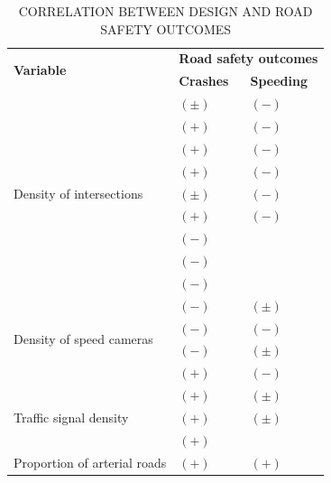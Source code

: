 \begin{table}[!hbtp]
    \footnotesize
    \captionsetup{justification=raggedright,
        singlelinecheck=false,
        font=footnotesize}
    \caption{CORRELATION BETWEEN DESIGN AND ROAD SAFETY OUTCOMES}
    \centering
    \begin{tabular}{p{2.5cm}p{6.2cm}p{6.2cm}}
        \hline
        \multicolumn{1}{l}{\multirow{2}{*}{\textbf{Variable}}} & \multicolumn{2}{c}{\textbf{Road safety outcomes}} \\
        \multicolumn{1}{c}{} & \textbf{Crashes} & \textbf{Speeding} \\ \hline
        \multirow{9}{2cm}{Density of intersections} & $(\pm)$ \textcite{Dumbaugh2009} & $(-)$ \textcite{Dumbaugh2009} \\
         & $(+)$ \textcite{Dumbaugh2011} & $(-)$ \textcite{Elvik2009} \\
         & $(+)$ \textcite{Dumbaugh2013} & $(-)$ \textcite{Ewing2009} \\
         & $(+)$ \textcite{Elvik2009} & $(-)$ \textcite{Huang2018} \\
         & $(\pm)$ \textcite{Ewing2009} & $(-)$ \textcite{Obelheiro2019} \\
         & $(+)$ \textcite{Huang2018} & $(-)$ \textcite{Obelheiro2020} \\
         & $(-)$ \textcite{Marshall2011} &  \\
         & $(-)$ \textcite{Ouyang2014} &  \\
         & $(-)$ \textcite{Zhang2015} &  \\ \hline
        \multirow{4}{2cm}{Density of speed cameras} & $(-)$ \textcite{Høye2015} & $(\pm)$ \textcite{Amancio2021} \\
         & $(-)$ \textcite{Li2013a} & $(-)$ \textcite{Li2013a} \\
         & $(-)$ \textcite{Li2020} & $(\pm)$ \textcite{Li2020} \\
         & $(+)$ \textcite{Park2019} & $(-)$ \textcite{Oliveira2015} \\ \hline
        \multirow{3}{2cm}{Traffic signal density} & $(+)$ \textcite{Obelheiro2020} & $(\pm)$ \textcite{Elvik2009} \\
         & $(+)$ \textcite{Lovegrove2006} & $(\pm)$ \textcite{Furth2018} \\
         & $(+)$ \textcite{Lee2015} & \\ \hline
        \multirow{9}{2cm}{Proportion of arterial roads} & $(+)$ \textcite{Dumbaugh2009} & $(+)$ \textcite{Dumbaugh2011} \\

\end{tabular}
\end{table}
